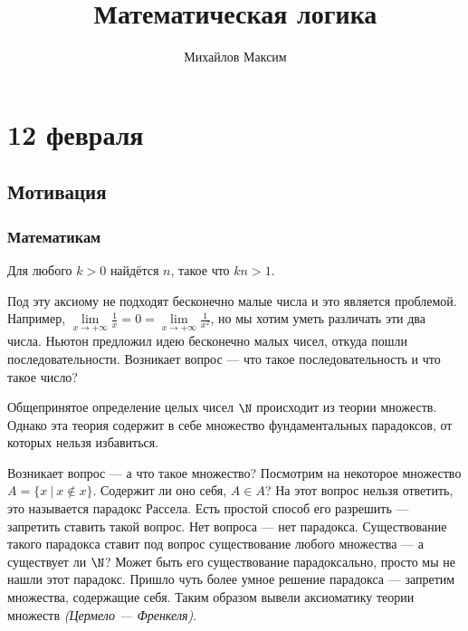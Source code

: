 \documentclass[12pt, a4paper, oneside]{book}
\begin{document}
\title{Математическая логика}
\author{Михайлов Максим}

\maketitle

\tableofcontents

\chapter{12 февраля}

\setcounter{section}{-1}

\section{Мотивация}

\subsection{Математикам}

\begin{axiom}[Архимеда]
    Для любого \(k > 0\) найдётся \(n\), такое что \(kn > 1\).
\end{axiom}

Под эту аксиому не подходят бесконечно малые числа и это является проблемой. Например, \(\lim\limits_{x \to +\infty} \frac{1}{x} = 0 = \lim\limits_{x \to +\infty} \frac{1}{x^2}\), но мы хотим уметь различать эти два числа. Ньютон предложил идею бесконечно малых чисел, откуда пошли последовательности. Возникает вопрос --- что такое последовательность и что такое число?

Общепринятое определение целых чисел \(\N\) происходит из теории множеств. Однако эта теория содержит в себе множество фундаментальных парадоксов, от которых нельзя избавиться.

Возникает вопрос --- а что такое множество? Посмотрим на некоторое множество \(A = \{x\ |\ x\not\in x\}\). Содержит ли оно себя, \(A\in A\)? На этот вопрос нельзя ответить, это называется парадокс Рассела. Есть простой способ его разрешить --- запретить ставить такой вопрос. Нет вопроса --- нет парадокса. Существование такого парадокса ставит под вопрос существование любого множества --- а существует ли \(\N\)? Может быть его существование парадоксально, просто мы не нашли этот парадокс. Пришло чуть более умное решение парадокса --- запретим множества, содержащие себя. Таким образом вывели аксиоматику теории множеств \textit{(Цермело --- Френкеля)}.
\end{document}
